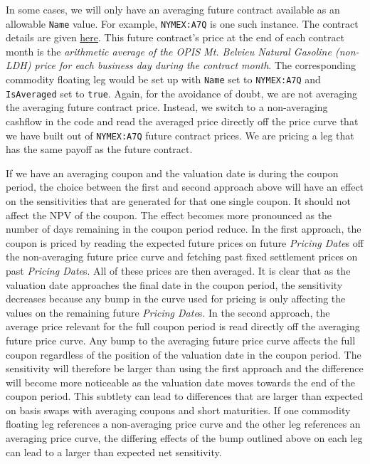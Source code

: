 In some cases, we will only have an averaging future contract available as an allowable \lstinline!Name! value. For example, \lstinline!NYMEX:A7Q! is one such instance. The contract details are given \href{https://www.cmegroup.com/trading/energy/petrochemicals/mont-belvieu-natural-gasoline-5-decimal-opis-swap_contract_specifications.html}{here}. This future contract's price at the end of each contract month is the \textit{arithmetic average of the OPIS Mt. Belvieu Natural Gasoline (non-LDH) price for each business day during the contract month}. The corresponding commodity floating leg would be set up with \lstinline!Name! set to \lstinline!NYMEX:A7Q! and \lstinline!IsAveraged! set to \lstinline!true!. Again, for the avoidance of doubt, we are not averaging the averaging future contract price. Instead, we switch to a non-averaging cashflow in the code and read the averaged price directly off the price curve that we have built out of \lstinline!NYMEX:A7Q! future contract prices. We are pricing a leg that has the same payoff as the future contract.

If we have an averaging coupon and the valuation date is during the coupon period, the choice between the first and second approach above will have an effect on the sensitivities that are generated for that one single coupon. It should not affect the NPV of the coupon. The effect becomes more pronounced as the number of days remaining in the coupon period reduce. In the first approach, the coupon is priced by reading the expected future prices on future \textit{Pricing Date}s off the non-averaging future price curve and fetching past fixed settlement prices on past \textit{Pricing Date}s. All of these prices are then averaged. It is clear that as the valuation date approaches the final date in the coupon period, the sensitivity decreases because any bump in the curve used for pricing is only affecting the values on the remaining future \textit{Pricing Date}s. In the second approach, the average price relevant for the full coupon period is read directly off the averaging future price curve. Any bump to the averaging future price curve affects the full coupon regardless of the position of the valuation date in the coupon period. The sensitivity will therefore be larger than using the first approach and the difference will become more noticeable as the valuation date moves towards the end of the coupon period. This subtlety can lead to differences that are larger than expected on basis swaps with averaging coupons and short maturities. If one commodity floating leg references a non-averaging price curve and the other leg references an averaging price curve, the differing effects of the bump outlined above on each leg can lead to a larger than expected net sensitivity.

